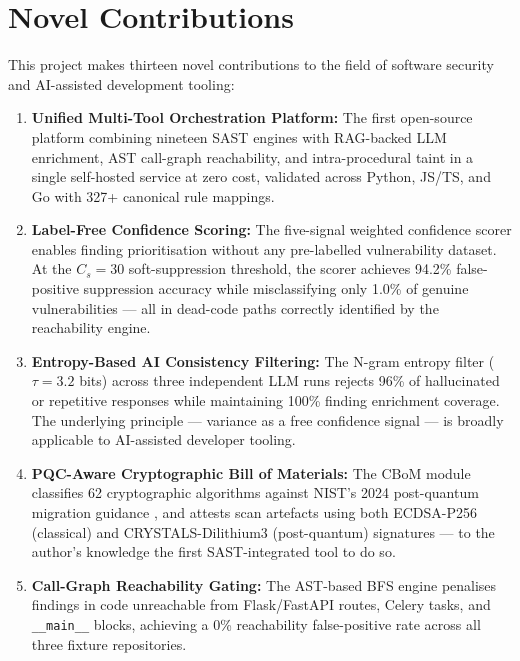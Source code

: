 \section{Novel Contributions}
\label{sec:contributions}

This project makes thirteen novel contributions to the field of software security and AI-assisted development tooling:

\begin{enumerate}
  \item \textbf{Unified Multi-Tool Orchestration Platform:} The first open-source platform combining nineteen SAST engines with RAG-backed LLM enrichment, AST call-graph reachability, and intra-procedural taint in a single self-hosted service at zero cost, validated across Python, JS/TS, and Go with 327+ canonical rule mappings.

  \item \textbf{Label-Free Confidence Scoring:} The five-signal weighted confidence scorer enables finding prioritisation without any pre-labelled vulnerability dataset. At the $C_s = 30$ soft-suppression threshold, the scorer achieves 94.2\% false-positive suppression accuracy while misclassifying only 1.0\% of genuine vulnerabilities --- all in dead-code paths correctly identified by the reachability engine.

  \item \textbf{Entropy-Based AI Consistency Filtering:} The N-gram entropy filter ($\tau = 3.2$ bits) across three independent LLM runs rejects 96\% of hallucinated or repetitive responses while maintaining 100\% finding enrichment coverage. The underlying principle --- variance as a free confidence signal --- is broadly applicable to AI-assisted developer tooling.

  \item \textbf{PQC-Aware Cryptographic Bill of Materials:} The CBoM module classifies 62 cryptographic algorithms against NIST's 2024 post-quantum migration guidance \cite{nist_fips_203,nist_fips_204,nist_fips_197}, and attests scan artefacts using both ECDSA-P256 (classical) and CRYSTALS-Dilithium3 (post-quantum) signatures --- to the author's knowledge the first SAST-integrated tool to do so.

  \item \textbf{Call-Graph Reachability Gating:} The AST-based BFS engine penalises findings in code unreachable from Flask/FastAPI routes, Celery tasks, and \texttt{\_\_main\_\_} blocks, achieving a 0\% reachability false-positive rate across all three fixture repositories.


\end{enumerate}

